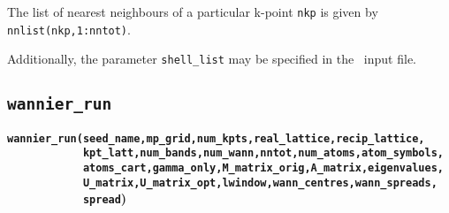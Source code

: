The list of nearest neighbours of a particular k-point \verb#nkp# is
given by \verb#nnlist(nkp,1:nntot)#.

Additionally, the parameter \verb#shell_list#
may be specified in the \wannier\ input file.

\subsection{{\tt wannier\_run}} \label{wannier_run}

{\noindent \bf \verb#wannier_run(seed_name,mp_grid,num_kpts,real_lattice,recip_lattice,#\\
\verb#            kpt_latt,num_bands,num_wann,nntot,num_atoms,atom_symbols,#\\
\verb#            atoms_cart,gamma_only,M_matrix_orig,A_matrix,eigenvalues,#\\
\verb#            U_matrix,U_matrix_opt,lwindow,wann_centres,wann_spreads,#\\
\verb#            spread#)}

